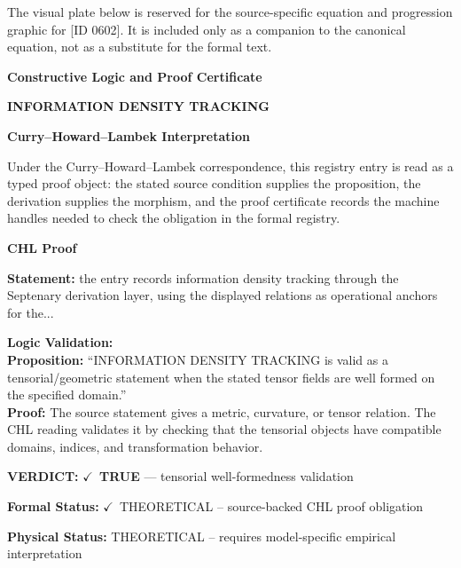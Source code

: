 \begingroup\footnotesize\sloppy
The visual plate below is reserved for the source-specific equation and progression graphic for [ID 0602]. It is included only as a companion to the canonical equation, not as a substitute for the formal text.
\par\endgroup
\ifTZPDarkEdition
{}
\fi

\clearpage
\begingroup\tzpsupportsetup
\noindent\textbf{\fontsize{10.8pt}{12.8pt}\selectfont [ID 0602] Constructive Logic and Proof Certificate}\par
\noindent\textbf{\fontsize{10pt}{12pt}\selectfont INFORMATION DENSITY TRACKING}\par
\vspace{0.45em}
\begingroup
\footnotesize
\setlength{\parskip}{0.22em}
\setlength{\parindent}{0pt}
\noindent\textbf{Curry--Howard--Lambek Interpretation}\par
Under the Curry--Howard--Lambek correspondence, this registry entry is read as a typed proof
object: the stated source condition supplies the proposition, the derivation supplies the
morphism, and the proof certificate records the machine handles needed to check the obligation
in the formal registry.

\vspace{0.45em}
\noindent\textbf{CHL Proof}\par
\textbf{Statement:} the entry records information density tracking through the Septenary derivation layer,
using the displayed relations as operational anchors for the...

\textbf{Logic Validation:}\\
\textbf{Proposition:} ``INFORMATION DENSITY TRACKING is valid as a tensorial/geometric statement when the stated
tensor fields are well formed on the specified domain.''\\
\textbf{Proof:} The source statement gives a metric, curvature, or tensor relation. The CHL reading
validates it by checking that the tensorial objects have compatible domains, indices,
and transformation behavior.

\textbf{VERDICT:} \ensuremath{\checkmark}\ \textbf{TRUE} --- tensorial well-formedness validation

\textbf{Formal Status:} \ensuremath{\checkmark}\ THEORETICAL -- source-backed CHL proof obligation

\textbf{Physical Status:} THEORETICAL -- requires model-specific empirical interpretation
\par\vspace{0.45em}
\par
\ifTZPDarkEdition
{}
\fi
\endgroup
\endgroup
